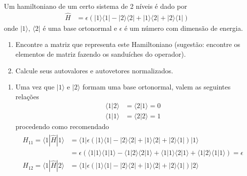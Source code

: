 	 \begin{prob}
		 Um hamiltoniano de um certo sistema de 2 níveis é dado por
		 \begin{align}
			 \hat{H}&=\epsilon \left(|1\rangle\langle 1|-|2\rangle\langle  2|+|1\rangle\langle  2|+|2\rangle\langle  1|\right)
		 \end{align}
		 onde $|1\rangle$, $\langle  2|$ é uma base ortonormal e $\epsilon$ é um número com dimensão de energia.

		 \begin{enumerate}[label=\alph *)]
			 \item Encontre a matriz que representa este Hamiltoniano (sugestão: encontre os elementos de matriz fazendo os sanduíches do operador).
			 \item Calcule seus autovalores e autovetores normalizados.
		 \end{enumerate}
		 \begin{sol}
		 	\begin{enumerate}[label=\alph *)]
		 			\item Uma vez que $|{1}\rangle$ e $|{2}\rangle$ formam uma base ortonormal, valem as seguintes relações
						\begin{subequations}
							\begin{align}
								\langle{1}|{2}\rangle &= \langle{2}|{1}\rangle = 0\\
								\langle{1}|{1}\rangle &= \langle{2}|{2}\rangle = 1
							\end{align}
					\end{subequations}
					procedendo como recomendado
					\begin{align}
						\begin{split}
							H_{11} = \langle{1}|\hat{H}|{1}\rangle &= \langle{1}|\epsilon \left(|1\rangle\langle 1|-|2\rangle\langle  2|+|1\rangle\langle  2|+|2\rangle\langle  1|\right)|{1}\rangle\\
																										 &=\epsilon \left(\langle{1}|1\rangle\langle 1|{1}\rangle-\langle{1}|2\rangle\langle  2|{1}\rangle+\langle{1}|1\rangle\langle  2|{1}\rangle+\langle{1}|2\rangle\langle  1|{1}\rangle\right)=\epsilon\\
							H_{12} = \langle{1}|\hat{H}|{2}\rangle &= \langle{1}|\epsilon \left(|1\rangle\langle 1|-|2\rangle\langle  2|+|1\rangle\langle  2|+|2\rangle\langle  1|\right)|{2}\rangle\\

\end{split}
\end{align}
\end{enumerate}
\end{sol}
\end{prob}
